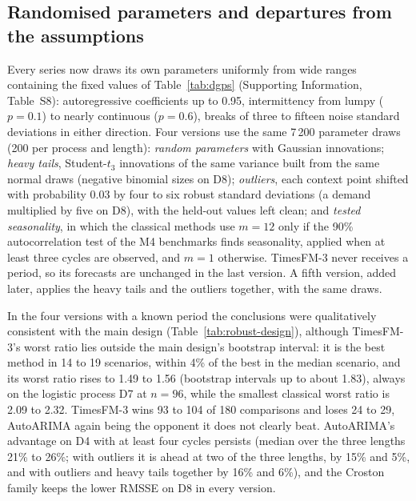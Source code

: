 \documentclass[ASNA]{USG}
\providecommand{\tableref}[1]{Table~\ref{#1}}
\begin{document}
\subsection{Randomised parameters and departures from the assumptions}
\label{sec:departures}

Every series now draws its own parameters uniformly from wide ranges containing the fixed values of
\tableref{tab:dgps} (Supporting Information, Table~S8): autoregressive coefficients up to 0.95,
intermittency from lumpy ($p = 0.1$) to nearly continuous ($p = 0.6$), breaks of three to fifteen noise
standard deviations in either direction. Four versions use the same 7\,200 parameter draws (200 per process
and length): \emph{random parameters} with Gaussian innovations; \emph{heavy tails}, Student-$t_3$
innovations of the same variance built from the same normal draws (negative binomial sizes on D8);
\emph{outliers}, each context point shifted with probability 0.03 by four to six robust standard deviations
(a demand multiplied by five on D8), with the held-out values left clean; and \emph{tested seasonality}, in
which the classical methods use $m = 12$ only if the 90\% autocorrelation test of the M4 benchmarks
\citep{makridakis2020m4} finds seasonality, applied when at least three cycles are observed, and $m = 1$
otherwise. TimesFM-3 never receives a period, so its forecasts are unchanged in the last version. A fifth
version, added later, applies the heavy tails and the outliers together, with the same draws.



In the four versions with a known period the conclusions were qualitatively consistent with the main
design (\tableref{tab:robust-design}), although TimesFM-3's worst ratio lies outside the main design's
bootstrap interval: it is the best method in 14 to 19 scenarios, within 4\% of the best in the median scenario, and
its worst ratio rises to 1.49 to 1.56 (bootstrap intervals up to about 1.83), always on the logistic process
D7 at $n = 96$, while the smallest classical worst ratio is 2.09 to 2.32. TimesFM-3 wins 93 to 104 of 180 comparisons and loses 24 to 29, AutoARIMA again being the opponent it does not clearly beat. AutoARIMA's
advantage on D4 with at least four cycles persists (median over the three lengths 21\% to 26\%; with outliers it is ahead at two of the three lengths, by 15\% and 5\%, and with outliers and heavy
tails together by 16\% and 6\%), and the Croston family keeps the lower
RMSSE on D8 in every version.
\end{document}
